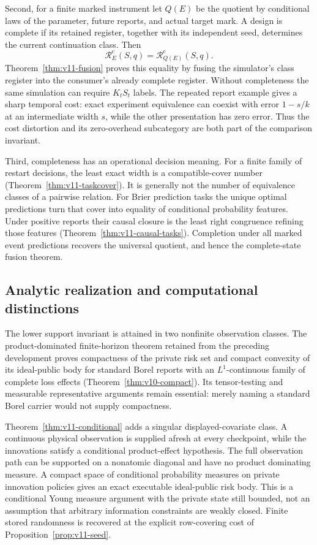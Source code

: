 Second, for a finite marked instrument let $Q(E)$ be the quotient by
conditional laws of the parameter, future reports, and actual target mark.
A design is complete if its retained register, together with its independent
seed, determines the current continuation class. Then
\[
 \mathcal R_E^{\mathrm c}(S,q)=
                 \mathcal R_{Q(E)}^{\mathrm c}(S,q).
\]
Theorem~\ref{thm:v11-fusion} proves this equality by fusing the simulator's
class register into the consumer's already complete register. Without
completeness the same simulation can require $K_tS_t$ labels. The repeated
report example gives a sharp temporal cost: exact experiment equivalence
can coexist with error $1-s/k$ at an intermediate width $s$, while the
other presentation has zero error. Thus the cost distortion and its
zero-overhead subcategory are both part of the comparison invariant.

Third, completeness has an operational decision meaning. For a finite
family of restart decisions, the least exact width is a compatible-cover
number (Theorem~\ref{thm:v11-taskcover}). It is generally not the number
of equivalence classes of a pairwise relation. For Brier prediction tasks
the unique optimal predictions turn that cover into equality of conditional
probability features. Under positive reports their causal closure is the
least right congruence refining those features
(Theorem~\ref{thm:v11-causal-tasks}). Completion under all marked event
predictions recovers the universal quotient, and hence the complete-state
fusion theorem.

\subsection{Analytic realization and computational distinctions}
The lower support invariant is attained in two nonfinite observation
classes. The product-dominated finite-horizon theorem retained from the
preceding development proves compactness of the private risk set and
compact convexity of its ideal-public body for standard Borel reports
with an $L^1$-continuous family of complete loss effects
(Theorem~\ref{thm:v10-compact}). Its tensor-testing and measurable
representative arguments remain essential: merely naming a standard Borel
carrier would not supply compactness.

Theorem~\ref{thm:v11-conditional} adds a singular displayed-covariate
class. A continuous physical observation is supplied afresh at every
checkpoint, while the innovations satisfy a conditional product-effect
hypothesis. The full observation path can be supported on a nonatomic
diagonal and have no product dominating measure. A compact space of
conditional probability measures on private innovation policies gives an
exact executable ideal-public risk body. This is a conditional Young
measure argument with the private state still bounded, not an assumption
that arbitrary information constraints are weakly closed. Finite stored
randomness is recovered at the explicit row-covering cost of
Proposition~\ref{prop:v11-seed}.

